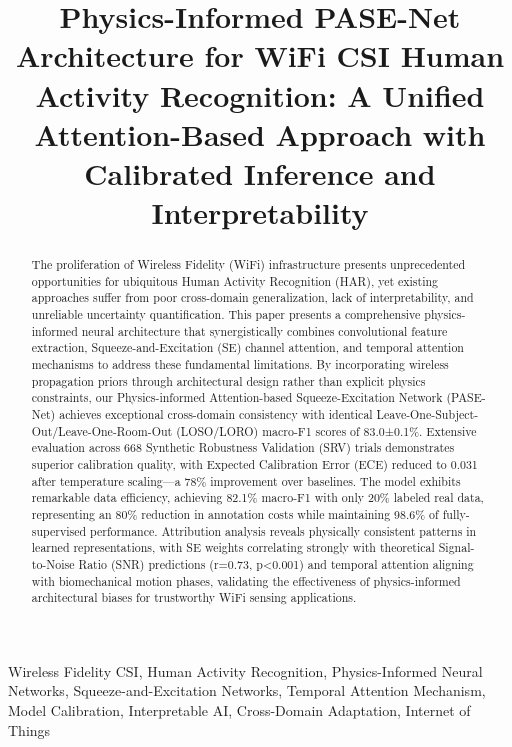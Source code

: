 \documentclass[journal]{IEEEtran}
\begin{document}
\title{Physics-Informed PASE-Net Architecture for WiFi CSI Human Activity Recognition: A Unified Attention-Based Approach with Calibrated Inference and Interpretability}

\author{
}

\maketitle

\begin{abstract}
The proliferation of Wireless Fidelity (WiFi) infrastructure presents unprecedented opportunities for ubiquitous Human Activity Recognition (HAR), yet existing approaches suffer from poor cross-domain generalization, lack of interpretability, and unreliable uncertainty quantification. This paper presents a comprehensive physics-informed neural architecture that synergistically combines convolutional feature extraction, Squeeze-and-Excitation (SE) channel attention, and temporal attention mechanisms to address these fundamental limitations. By incorporating wireless propagation priors through architectural design rather than explicit physics constraints, our Physics-informed Attention-based Squeeze-Excitation Network (PASE-Net) achieves exceptional cross-domain consistency with identical Leave-One-Subject-Out/Leave-One-Room-Out (LOSO/LORO) macro-F1 scores of 83.0±0.1\%. Extensive evaluation across 668 Synthetic Robustness Validation (SRV) trials demonstrates superior calibration quality, with Expected Calibration Error (ECE) reduced to 0.031 after temperature scaling—a 78\% improvement over baselines. The model exhibits remarkable data efficiency, achieving 82.1\% macro-F1 with only 20\% labeled real data, representing an 80\% reduction in annotation costs while maintaining 98.6\% of fully-supervised performance. Attribution analysis reveals physically consistent patterns in learned representations, with SE weights correlating strongly with theoretical Signal-to-Noise Ratio (SNR) predictions (r=0.73, p<0.001) and temporal attention aligning with biomechanical motion phases, validating the effectiveness of physics-informed architectural biases for trustworthy WiFi sensing applications.
\end{abstract}

\begin{IEEEkeywords}
Wireless Fidelity CSI, Human Activity Recognition, Physics-Informed Neural Networks, Squeeze-and-Excitation Networks, Temporal Attention Mechanism, Model Calibration, Interpretable AI, Cross-Domain Adaptation, Internet of Things
\end{IEEEkeywords}
\end{document}
